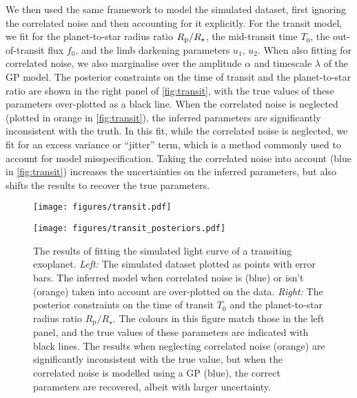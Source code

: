 \documentclass[letterpaper]{ar-1col}
\newcommand{\amplitude}{\ensuremath{\alpha}}
\newcommand{\lengthscale}{\ensuremath{\lambda}}
\begin{document}
We then used the same framework to model the simulated dataset, first ignoring the correlated noise and then accounting for it explicitly.
For the transit model, we fit for the planet-to-star radius ratio $R_{\rm p}/R_\star$, the mid-transit time $T_0$, the out-of-transit flux $f_0$, and the limb darkening parameters $u_1,\,u_2$.
When also fitting for correlated noise, we also marginalise over the amplitude $\amplitude$ and timescale $\lengthscale$ of the GP model.
The posterior constraints on the time of transit and the planet-to-star ratio are shown in the right panel of \autoref{fig:transit}, with the true values of these parameters over-plotted as a black line.
When the correlated noise is neglected (plotted in orange in \autoref{fig:transit}), the inferred parameters are significantly inconsistent with the truth.
In this fit, while the correlated noise is neglected, we fit for an excess variance or ``jitter'' term, which is a method commonly used to account for model misspecification.
Taking the correlated noise into account (blue in \autoref{fig:transit}) increases the uncertainties on the inferred parameters, but also shifts the results to recover the true parameters.


\begin{figure}[ht]
  \centering
  \begin{minipage}[t]{0.5\linewidth}
    \texttt{[image: figures/transit.pdf]}
  \end{minipage} \hfill
  \begin{minipage}[t]{0.44\linewidth}
    \texttt{[image: figures/transit\_posteriors.pdf]}
  \end{minipage}
  \caption{The results of fitting the simulated light curve of a transiting exoplanet.
  \emph{Left:} The simulated dataset plotted as points with error bars.
  The inferred model when correlated noise is (blue) or isn't (orange) taken into account are over-plotted on the data.
  \emph{Right:} The posterior constraints on the time of transit $T_0$ and the planet-to-star radius ratio $R_\mathrm{p}/R_\star$.
  The colours in this figure match those in the left panel, and the true values of these parameters are indicated with black lines.
  The results when neglecting correlated noise (orange) are significantly inconsistent with the true value, but when the correlated noise is modelled using a GP (blue), the correct parameters are recovered, albeit with larger uncertainty.}
  \label{fig:transit}
\end{figure}
\end{document}
